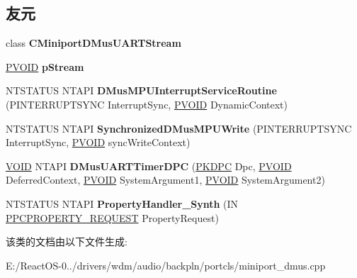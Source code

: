 \subsection*{友元}
\begin{DoxyCompactItemize}
\item 
\mbox{\label{class_c_miniport_d_mus_u_a_r_t_aeb4ec54928d1690e06aea5f45a079466}} 
class {\bfseries C\+Miniport\+D\+Mus\+U\+A\+R\+T\+Stream}
\item 
\mbox{\label{class_c_miniport_d_mus_u_a_r_t_a1592bfd88f7a8fc6a81fa2c18fcfa3eb}} 
\hyperlink{interfacevoid}{P\+V\+O\+ID} {\bfseries p\+Stream}
\item 
\mbox{\label{class_c_miniport_d_mus_u_a_r_t_a9fa5501e1ea164b0909705a251de5a20}} 
N\+T\+S\+T\+A\+T\+US N\+T\+A\+PI {\bfseries D\+Mus\+M\+P\+U\+Interrupt\+Service\+Routine} (P\+I\+N\+T\+E\+R\+R\+U\+P\+T\+S\+Y\+NC Interrupt\+Sync, \hyperlink{interfacevoid}{P\+V\+O\+ID} Dynamic\+Context)
\item 
\mbox{\label{class_c_miniport_d_mus_u_a_r_t_a52dbd109f3e16a271f00d5f292e23e2d}} 
N\+T\+S\+T\+A\+T\+US N\+T\+A\+PI {\bfseries Synchronized\+D\+Mus\+M\+P\+U\+Write} (P\+I\+N\+T\+E\+R\+R\+U\+P\+T\+S\+Y\+NC Interrupt\+Sync, \hyperlink{interfacevoid}{P\+V\+O\+ID} sync\+Write\+Context)
\item 
\mbox{\label{class_c_miniport_d_mus_u_a_r_t_a6b49392461fedaebed198a1c0373c1f6}} 
\hyperlink{interfacevoid}{V\+O\+ID} N\+T\+A\+PI {\bfseries D\+Mus\+U\+A\+R\+T\+Timer\+D\+PC} (\hyperlink{struct___k_d_p_c}{P\+K\+D\+PC} Dpc, \hyperlink{interfacevoid}{P\+V\+O\+ID} Deferred\+Context, \hyperlink{interfacevoid}{P\+V\+O\+ID} System\+Argument1, \hyperlink{interfacevoid}{P\+V\+O\+ID} System\+Argument2)
\item 
\mbox{\label{class_c_miniport_d_mus_u_a_r_t_a66e66841440220a640509926ba4994d0}} 
N\+T\+S\+T\+A\+T\+US N\+T\+A\+PI {\bfseries Property\+Handler\+\_\+\+Synth} (IN \hyperlink{struct___p_c_p_r_o_p_e_r_t_y___r_e_q_u_e_s_t}{P\+P\+C\+P\+R\+O\+P\+E\+R\+T\+Y\+\_\+\+R\+E\+Q\+U\+E\+ST} Property\+Request)
\end{DoxyCompactItemize}


该类的文档由以下文件生成\+:\begin{DoxyCompactItemize}
\item 
E\+:/\+React\+O\+S-\/0../drivers/wdm/audio/backpln/portcls/miniport\+\_\+dmus.\+cpp\end{DoxyCompactItemize}
